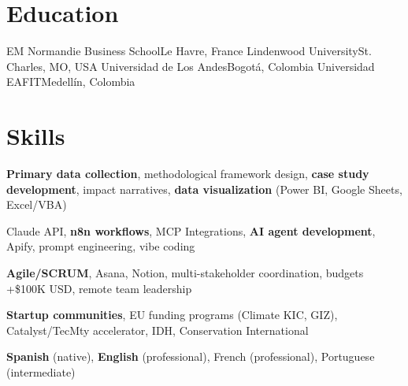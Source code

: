 \documentclass[11pt,a4paper,sans]{moderncv}
\begin{document}
\section{Education}
%
{EM Normandie Business School}{Le Havre, France}{}{}
%
{Lindenwood University}{St. Charles, MO, USA}{}{}
%
{Universidad de Los Andes}{Bogotá, Colombia}{}{}
%
{Universidad EAFIT}{Medellín, Colombia}{}{}

\section{Skills}
%
{\normalfont \textbf{Primary data collection}, methodological framework design,
\textbf{case study development}, impact narratives,
\textbf{data visualization} (Power BI, Google Sheets, Excel/VBA)}{}{}{}{}

%
{\normalfont Claude API, \textbf{n8n workflows}, MCP Integrations,
\textbf{AI agent development}, Apify, prompt engineering, vibe coding}{}{}{}{}

%
{\normalfont \textbf{Agile/SCRUM}, Asana, Notion, multi-stakeholder coordination,
budgets +\$100K USD, remote team leadership}{}{}{}{}

%
{\normalfont \textbf{Startup communities}, EU funding programs (Climate KIC, GIZ),
Catalyst/TecMty accelerator, IDH, Conservation International}{}{}{}{}

%
{\normalfont \textbf{Spanish} (native), \textbf{English} (professional),
French (professional), Portuguese (intermediate)}{}{}{}{}
\end{document}
